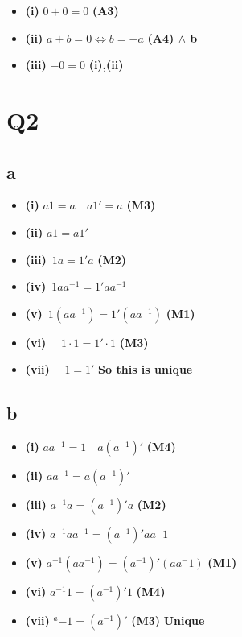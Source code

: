 \documentclass[]{article}
\providecommand{\tightlist}{%
  \setlength{\itemsep}{0pt}\setlength{\parskip}{0pt}}
\begin{document}
\begin{itemize}
\tightlist
\item
  \textbf{(i)} \(0+0 = 0\) \textbf{(A3)}
\item
  \textbf{(ii)} \(a + b = 0 \iff b = -a\) \textbf{(A4) \(\wedge\) b}
\item
  \textbf{(iii)} \(-0 = 0\) \textbf{(i),(ii)}
\end{itemize}

\hypertarget{q2}{%
\section{Q2}\label{q2}}

\hypertarget{a}{%
\subsection{a}\label{a}}

\begin{itemize}
\tightlist
\item
  \textbf{(i)} \(a1 = a \quad a1' = a\) \textbf{(M3)}
\item
  \textbf{(ii)} \(a1 = a1'\)
\item
  \textbf{(iii)} \(\, 1a = 1'a\) \textbf{(M2)}
\item
  \textbf{(iv)} \(\,1 a a^{-1} = 1' a a^{-1}\)
\item
  \textbf{(v)} \(\,1 (a a^{-1}) = 1' (a a^{-1})\) \textbf{(M1)}
\item
  \textbf{(vi)} \(\quad 1 \cdot 1 = 1' \cdot 1\) \textbf{(M3)}
\item
  \textbf{(vii)} \(\quad 1 = 1'\) \textbf{So this is unique}
\end{itemize}

\hypertarget{b}{%
\subsection{b}\label{b}}

\begin{itemize}
\tightlist
\item
  \textbf{(i)} \(a a^{-1} = 1 \quad a (a^{-1})'\) \textbf{(M4)}
\item
  \textbf{(ii)} \(aa^{-1} = a(a^{-1})'\)
\item
  \textbf{(iii)} \(a^{-1}a = (a^{-1})'a\) \textbf{(M2)}
\item
  \textbf{(iv)} \(a^{-1}a a^{-1} = (a^{-1})' a a^-1\)
\item
  \textbf{(v)} \(a^{-1}(a a^{-1}) = (a^{-1})' (a a^-1)\) \textbf{(M1)}
\item
  \textbf{(vi)} \(a^{-1} 1 = (a^{-1})' 1\) \textbf{(M4)}
\item
  \textbf{(vii)} \(^a{-1} = (a^{-1})'\) \textbf{(M3)} \textbf{Unique}
\end{itemize}
\end{document}

